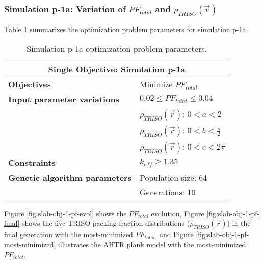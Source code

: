 \subsubsection{Simulation p-1a: Variation of $PF_{total}$ and $\rho_{TRISO}(\vec{r})$}
Table \ref{tab:simulationp1a} summarizes the optimization problem parameters for 
simulation p-1a. 
\begin{table}[htbp!]
    \centering
    \onehalfspacing
    \caption{Simulation p-1a optimization problem parameters.}
	\label{tab:simulationp1a}
    \footnotesize
    \begin{tabular}{l|p{4cm}}
    \hline 
    \multicolumn{2}{c}{\textbf{Single Objective: Simulation p-1a}} \\
    \hline 
    \textbf{Objectives} & Minimize $PF_{total}$ \\
    \hline 
    \textbf{Input parameter variations} & $0.02 \leq PF_{total} \leq 0.04$ \\
    & $\rho_{TRISO}(\vec{r})$: $0<a<2$ \\
    & $\rho_{TRISO}(\vec{r})$: $0<b<\frac{\pi}{2}$ \\
    & $\rho_{TRISO}(\vec{r})$: $0<c<2\pi$ \\
    \hline
    \textbf{Constraints} & $k_{eff} \geq 1.35$\\ 
    \hline 
    \textbf{Genetic algorithm parameters} & Population size: 64 \\
    & Generations: 10 \\
    \hline
    \end{tabular}
\end{table}
Figure \ref{fig:slab-obj-1-pf-evol} shows the $PF_{total}$ evolution,  
Figure \ref{fig:slab-obj-1-pf-final} shows the five TRISO packing fraction 
distributions ($\rho_{TRISO}(\vec{r})$) in the final generation with the 
most-minimized $PF_{total}$, and Figure \ref{fig:slab-obj-1-pf-most-minimized} 
illustrates the \gls{AHTR} plank model with the most-minimized $PF_{total}$.
